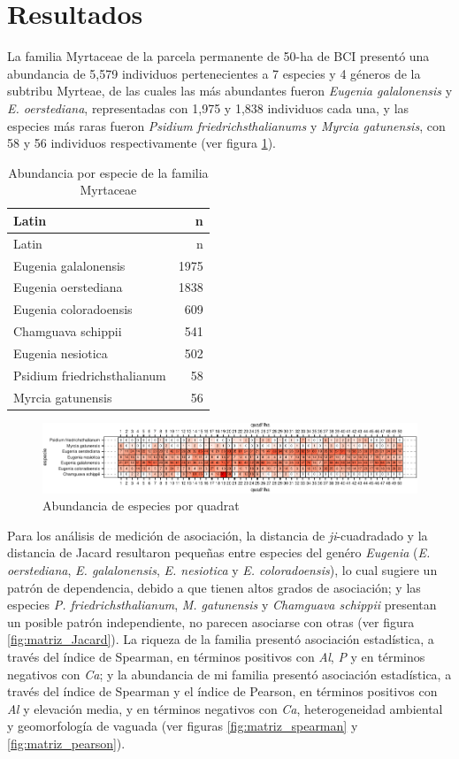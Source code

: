 \documentclass[11pt,]{article}
\begin{document}
\section{Resultados}\label{resultados}

La familia Myrtaceae de la parcela permanente de 50-ha de BCI presentó
una abundancia de 5,579 individuos pertenecientes a 7 especies y 4
géneros de la subtribu Myrteae, de las cuales las más abundantes fueron
\emph{Eugenia galalonensis} y \emph{E. oerstediana}, representadas con
1,975 y 1,838 individuos cada una, y las especies más raras fueron
\emph{Psidium friedrichsthalianums} y \emph{Myrcia gatunensis}, con 58 y
56 individuos respectivamente (ver figura \ref{tab:abun_sp}).

\begin{longtable}[]{@{}lr@{}}
\caption{\label{tab:abun_sp}Abundancia por especie de la familia
Myrtaceae}\tabularnewline
\toprule
Latin & n\tabularnewline
\midrule
\endfirsthead
\toprule
Latin & n\tabularnewline
\midrule
\endhead
Eugenia galalonensis & 1975\tabularnewline
Eugenia oerstediana & 1838\tabularnewline
Eugenia coloradoensis & 609\tabularnewline
Chamguava schippii & 541\tabularnewline
Eugenia nesiotica & 502\tabularnewline
Psidium friedrichsthalianum & 58\tabularnewline
Myrcia gatunensis & 56\tabularnewline
\bottomrule
\end{longtable}

\begin{figure}
\centering
\includegraphics{manuscrito_files/figure-latex/unnamed-chunk-3-1.pdf}
\caption{\label{fig:abun_sp_q}Abundancia de especies por quadrat}
\end{figure}

Para los análisis de medición de asociación, la distancia de
\emph{ji}-cuadradado y la distancia de Jacard resultaron pequeñas entre
especies del genéro \emph{Eugenia} (\emph{E. oerstediana}, \emph{E.
galalonensis}, \emph{E. nesiotica} y \emph{E. coloradoensis}), lo cual
sugiere un patrón de dependencia, debido a que tienen altos grados de
asociación; y las especies \emph{P. friedrichsthalianum}, \emph{M.
gatunensis} y \emph{Chamguava schippii} presentan un posible patrón
independiente, no parecen asociarse con otras (ver figura
\ref{fig:matriz_Jacard}). La riqueza de la familia presentó asociación
estadística, a través del índice de Spearman, en términos positivos con
\emph{Al}, \emph{P} y en términos negativos con \emph{Ca}; y la
abundancia de mi familia presentó asociación estadística, a través del
índice de Spearman y el índice de Pearson, en términos positivos con
\emph{Al} y elevación media, y en términos negativos con \emph{Ca},
heterogeneidad ambiental y geomorfología de vaguada (ver figuras
\ref{fig:matriz_spearman} y \ref{fig:matriz_pearson}).
\end{document}
